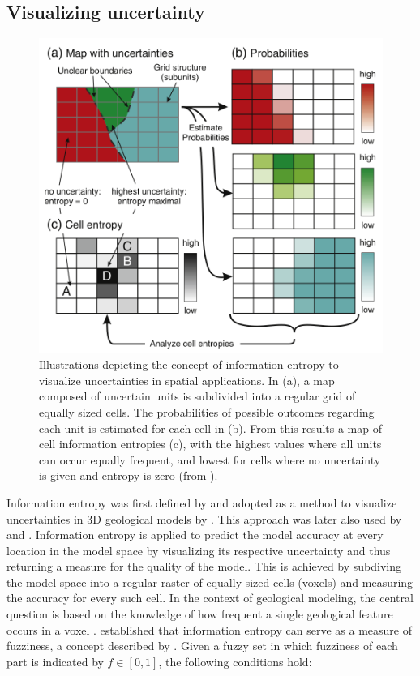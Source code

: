         \subsection{Visualizing uncertainty}
        \begin{figure}
	        \centering
	        \includegraphics[width=1\textwidth]{Figures/information_entropy.png}
	        \caption{Illustrations depicting the concept of information entropy to visualize uncertainties in spatial applications. In (a), a map composed of uncertain units is subdivided into a regular grid of equally sized cells. The probabilities of possible outcomes regarding each unit is estimated for each cell in (b). From this results a map of cell information entropies (c), with the highest values where all units can occur equally frequent, and lowest for cells where no uncertainty is given and entropy is zero (from \citet{wellmann2012uncertainties}).}\label{fig:information_entropy}
        \end{figure}
        Information entropy was first defined by \citet{shannon1948mathematical} and adopted as a method to visualize uncertainties in 3D geological models by \citet{wellmann2012uncertainties}. This approach was later also used by \citet{delaVarga2016} and \citet{schaaf2017}. Information entropy is applied to predict the model accuracy at every location in the model space by visualizing its respective uncertainty and thus returning a measure for the quality of the model. This is achieved by subdiving the model space into a regular raster of equally sized cells (voxels) and measuring the accuracy for every such cell. In the context of geological modeling, the central question is based on the knowledge of how frequent a single geological feature occurs in a voxel \citep{wellmann2012uncertainties}. \citet{de1972definition} established that information entropy can serve as a measure of fuzziness, a concept described by \citet{zadeh1965fuzzy}. Given a fuzzy set in which fuzziness of each part is indicated by $f\in [0,1]$, the following conditions hold:
